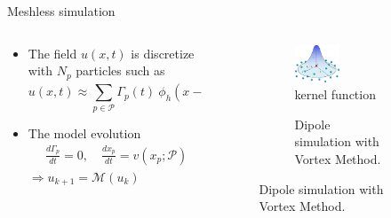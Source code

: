 \documentclass[aspectratio=169]{beamer} %
\begin{document}
\begin{frame}{Meshless simulation}
\begin{columns}[t]
\begin{column}{0.7\textwidth}
\begin{itemize}
                \item The field $u(x, t)$ is discretize with $N_p$ particles such as
                      \begin{equation*}
                          u(x, t) \approx \sum_{p \in \mathcal P} \Gamma_p(t)~\phi_h(x - x_p(t)), \quad \mathcal P = \left\{x_p, \Gamma_p\right\}_{p=1}^{N_p}
                      \end{equation*}
                \item The model evolution
                      \begin{eqnarray*}
                          \frac{d\Gamma_p}{dt} = 0, \quad \frac{d x_p}{d t} = v(x_p; \mathcal P)
                      \end{eqnarray*}
                      $\Rightarrow u_{k+1} = \mathcal M(u_{k})$
            \end{itemize}
        \end{column}
        \begin{column}{0.3\textwidth}
            \begin{figure}
                \begin{subfigure}[t]{\textwidth}
                    \centering
                    \includegraphics[width=0.5\textwidth]{images/kernel.png}
                    \caption*{\tiny kernel function}
                \end{subfigure}
                \centering
                \begin{subfigure}[b]{\textwidth}
                    \centering
                    \caption*{\tiny Dipole simulation with Vortex Method.}
                \end{subfigure}
            \end{figure}
        \end{column}
    \end{columns}
\end{frame}
\end{document}

